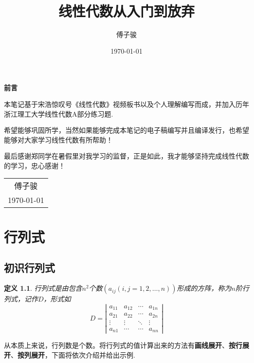 \documentclass[12pt, a4paper, oneside]{ctexbook}
\title{{\Huge{\textbf{线性代数从入门到放弃}}}}
\author{傅子骏}
\date{\today}
\newtheorem{definition}[theorem]{定义}
\begin{document}
\maketitle

\setcounter{page}{1}

\begin{center}
    \Huge\textbf{前言}
\end{center}


本笔记基于宋浩惊叹号《线性代数》视频板书以及个人理解编写而成，并加入历年浙江理工大学线性代数A部分练习题. 


希望能够巩固所学，当然如果能够完成本笔记的电子稿编写并且编译发行，也希望能够对大家学习线性代数有所帮助！ 


最后感谢郑同学在暑假里对我学习的监督，正是如此，我才能够坚持完成线性代数的学习，忠心感谢！ 
\newline
\begin{flushright}
    \begin{tabular}{c}
        傅子骏 \\ \today
    \end{tabular}
\end{flushright}

\newpage
{}
\setcounter{page}{1}
\tableofcontents

\newpage
\setcounter{page}{1}

\chapter{行列式}

\section{初识行列式}
\begin{definition}
    行列式是由包含$n^2$个数$(a_{ij}(i,j = 1,2,\dots,n))$形成的方阵，称为$n$阶行列式，记作$D$，形式如
    $$D=\left | \begin{matrix}
        a_{11} & a_{12} & \cdots & a_{1n} \\
        a_{21} & a_{22} & \cdots & a_{2n} \\
        \vdots & \vdots & \ddots & \vdots \\
        a_{n1} & \cdots & \cdots & a_{nn}
    \end{matrix} \right |$$
\end{definition}

从本质上来说，行列数是个数。将行列式的值计算出来的方法有\textbf{画线展开}、\textbf{按行展开}、\textbf{按列展开}，下面将依次介绍并给出示例. 
\end{document}
